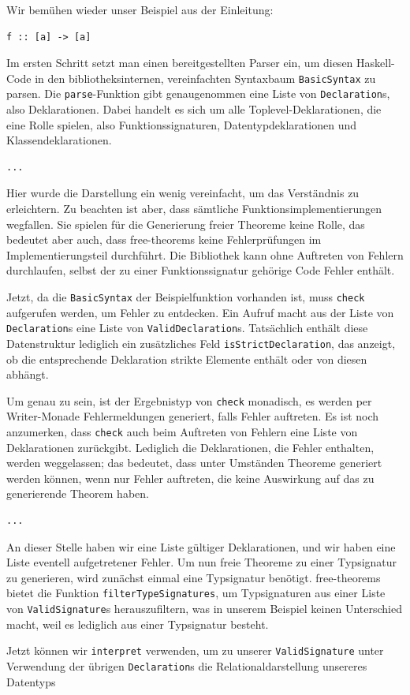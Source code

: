 
Wir bemühen wieder unser Beispiel aus der Einleitung:

\begin{verbatim}
f :: [a] -> [a]
\end{verbatim}

Im ersten Schritt setzt man einen bereitgestellten Parser ein, um diesen Haskell-Code in den bibliotheksinternen, vereinfachten
Syntaxbaum \texttt{BasicSyntax} zu parsen. Die \texttt{parse}-Funktion gibt genaugenommen eine Liste von \texttt{Declaration}s, also Deklarationen. Dabei handelt es sich um alle Toplevel-Deklarationen, die eine Rolle spielen, also Funktionssignaturen,
Datentypdeklarationen und Klassendeklarationen.

\begin{verbatim}
...
\end{verbatim}

Hier wurde die Darstellung ein wenig vereinfacht, um das Verständnis zu erleichtern. Zu beachten ist aber, dass sämtliche
Funktionsimplementierungen wegfallen. Sie spielen für die Generierung freier Theoreme keine Rolle, das bedeutet aber auch,
dass free-theorems keine Fehlerprüfungen im Implementierungsteil durchführt. Die Bibliothek kann ohne Auftreten von Fehlern
durchlaufen, selbst der zu einer Funktionssignatur gehörige Code Fehler enthält.

Jetzt, da die \texttt{BasicSyntax} der Beispielfunktion vorhanden ist, muss \texttt{check} aufgerufen werden, um Fehler
zu entdecken. Ein Aufruf macht aus der Liste von \texttt{Declaration}s eine Liste von \texttt{ValidDeclaration}s. Tatsächlich
enthält diese Datenstruktur lediglich ein zusätzliches Feld \texttt{isStrictDeclaration}, das anzeigt, ob die entsprechende
Deklaration strikte Elemente enthält oder von diesen abhängt.

Um genau zu sein, ist der Ergebnistyp von \texttt{check} monadisch, es werden per Writer-Monade Fehlermeldungen
generiert, falls Fehler auftreten. Es ist noch anzumerken, dass \texttt{check} auch beim Auftreten von Fehlern eine Liste
von Deklarationen zurückgibt. Lediglich die Deklarationen, die Fehler enthalten, werden weggelassen; das bedeutet, dass
unter Umständen Theoreme generiert werden können, wenn nur Fehler auftreten, die keine Auswirkung auf das zu generierende
Theorem haben.

\begin{verbatim}
...
\end{verbatim}

An dieser Stelle haben wir eine Liste gültiger Deklarationen, und wir haben eine Liste eventell aufgetretener Fehler. Um nun
freie Theoreme zu einer Typsignatur zu generieren, wird zunächst einmal eine Typsignatur benötigt. free-theorems bietet die
Funktion \texttt{filterTypeSignatures}, um Typsignaturen aus einer Liste von \texttt{ValidSignature}s herauszufiltern, was in
unserem Beispiel keinen Unterschied macht, weil es lediglich aus einer Typsignatur besteht.

Jetzt können wir \texttt{interpret} verwenden, um zu unserer \texttt{ValidSignature} unter Verwendung der übrigen
\texttt{Declaration}s die Relationaldarstellung unsereres Datentyps